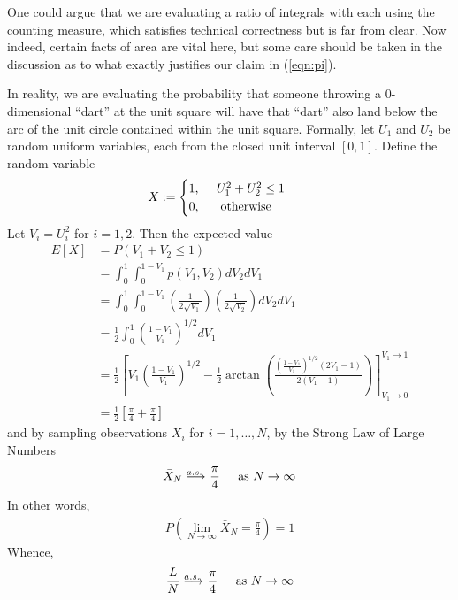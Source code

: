 One could argue that we are evaluating a ratio of integrals with each using the counting measure, which satisfies technical correctness but is far from clear.  Now indeed, certain facts of area are vital here, but some care should be taken in the discussion as to what exactly justifies our claim in (\ref{eqn:pi}).

In reality, we are evaluating the probability that someone throwing a 0-dimensional ``dart'' at the unit square will have that ``dart'' also land below the arc of the unit circle contained within the unit square.  Formally, let $U_1$ and $U_2$ be random uniform variables, each from the closed unit interval $[0, 1]$.  Define the random variable
\begin{align*}
X &:= 
\begin{cases} 
1\text{, } \hspace{.4cm} U_1^2 + U_2^2 \leq 1\\ 
0\text{, \hspace{.4cm} otherwise}
\end{cases}
\end{align*}
Let $V_i = U_i^2$ for $i=1, 2$. Then the expected value
\begin{align*}
E[X] &= P( V_1 + V_2 \leq 1 )\\
     &= \int_0^1 \int_0^{1-V_1} p(V_1, V_2)dV_2 dV_1\\
     &= \int_0^1 \int_0^{1-V_1} \left( \frac{1}{2\sqrt{V_1}} \right) \left( \frac{1}{2\sqrt{V_2}} \right)dV_2 dV_1\\
     &= \frac{1}{2}\int_0^1 \left(\frac{1-V_1}{V_1}\right)^{1/2}dV_1\\
     &= \frac{1}{2} \left[ 
	V_1\left(\frac{1-V_1}{V_1}\right)^{1/2} 
	 - \frac{1}{2} \arctan\left(\frac{\left(\frac{1-V_1}{V_1}\right)^{1/2} (2V_1-1)}{2(V_1-1)}\right) 
	\right]_{V_1\rightarrow 0}^{V_1\rightarrow 1}\\
     &= \frac{1}{2}\left[ \frac{\pi}{4} +\frac{\pi}{4}  \right]
\end{align*}
and by sampling observations $X_i$ for $i=1,\dots,N$, by the Strong Law of Large Numbers
\begin{align*}
\bar{X}_N \longrightarrow^{\hspace{-.55cm} a.s.} \hspace{.1cm} \frac{\pi}{4} \hspace{.4cm} \text{ as } N\rightarrow \infty
\end{align*}
In other words,
\begin{align*}
P\left(\lim_{N\rightarrow\infty} \bar{X}_N = \frac{\pi}{4}\right) = 1
\end{align*}
Whence,
\begin{align*}
\frac{L}{N}  \longrightarrow^{\hspace{-.55cm} a.s.} \hspace{.1cm} \frac{\pi}{4} \hspace{.4cm} \text{ as } N\rightarrow \infty
\end{align*}

